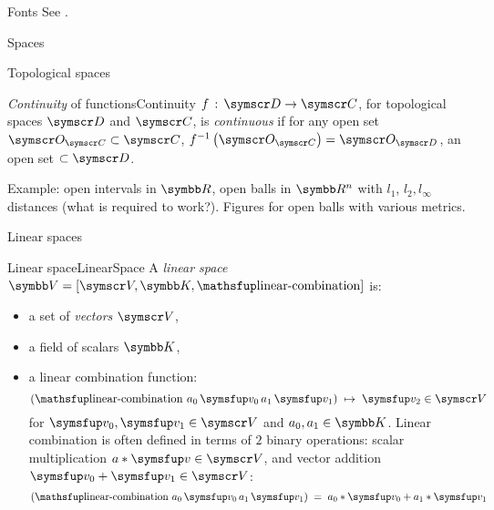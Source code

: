 \documentclass[12pt]{PalisadesLakesArticle}
\begin{document}
\begin{plSection}{Fonts}
See 
.

\begin{plSection}{Spaces}
\begin{plSection}{Topological spaces}
\label{sec:Topological-spaces}

\begin{plDefinition}{\textsl{Continuity} of functions}{Continuity} 
$f \, : \, \Set{D} \rightarrow \Set{C}$,
for topological spaces $\Set{D}$ and $\Set{C}$,
is \textit{continuous}
if for any open set $\Set{O}_{\Set{C}} \subset \Set{C}$,
$f^{-1}\left( \Set{O}_{\Set{C}} \right) = 
\Set{O}_{\Set{D}}$, an open set $\subset \Set{D}$.

Example: open intervals in $\Space{R}$,
open balls in $\Space{R}^n$ with $l_1$, $l_2, l_{\infty}$ distances
(what is required to work?).
Figures for open balls with various metrics.
\end{plDefinition}%

\end{plSection}%
\begin{plSection}{Linear spaces}
\label{sec:Linear-spaces}

\begin{plDefinition}{Linear space}{LinearSpace}
A \textit{linear space} 
$\Space{V} = \left[ \Set{V}, \Space{K}, \linearCombination \right]$
 is:
\begin{itemize}
  \item a set of \textit{vectors} $\Set{V}$,
  \item a field  of scalars $\Space{K}$,
  \item a linear combination function: 
\begin{equation}
\left( \linearCombination 
\, a_0 \, \Vector{v}_0 \, a_1 \, \Vector{v}_1 \right) \; 
 \mapsto \; \Vector{v}_2  \in \Set{V}
\end{equation}
for $\Vector{v}_0, \Vector{v}_1 \in \Set{V} $
and $a_0, a_1 \in \Space{K}$.
Linear combination is often defined in terms of
$2$ binary operations:
scalar multiplication $a * \Vector{v} \in \Set{V}$,
and vector addition $\Vector{v}_0 + \Vector{v}_1 \in \Set{V}$:
\begin{equation}
\left( \linearCombination 
\, a_0 \, \Vector{v}_0 \, a_1 \, \Vector{v}_1 \right) \; 
= \; a_0*\Vector{v}_0 + a_1*\Vector{v}_1
\end{equation}
\end{itemize}
\end{plDefinition}


\end{plSection}
\end{plSection}
\end{plSection}
\end{document}
